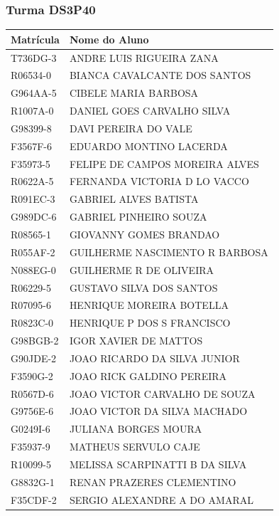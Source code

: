 \documentclass[
]{book}
\begin{document}
\subsubsection{Turma DS3P40}\label{turma-ds3p40}

\begin{longtable}[]{@{}ll@{}}
\toprule\noalign{}
Matrícula & Nome do Aluno \\
\midrule\noalign{}
\endhead
\bottomrule\noalign{}
\endlastfoot
T736DG-3 & ANDRE LUIS RIGUEIRA ZANA \\
R06534-0 & BIANCA CAVALCANTE DOS SANTOS \\
G964AA-5 & CIBELE MARIA BARBOSA \\
R1007A-0 & DANIEL GOES CARVALHO SILVA \\
G98399-8 & DAVI PEREIRA DO VALE \\
F3567F-6 & EDUARDO MONTINO LACERDA \\
F35973-5 & FELIPE DE CAMPOS MOREIRA ALVES \\
R0622A-5 & FERNANDA VICTORIA D LO VACCO \\
R091EC-3 & GABRIEL ALVES BATISTA \\
G989DC-6 & GABRIEL PINHEIRO SOUZA \\
R08565-1 & GIOVANNY GOMES BRANDAO \\
R055AF-2 & GUILHERME NASCIMENTO R BARBOSA \\
N088EG-0 & GUILHERME R DE OLIVEIRA \\
R06229-5 & GUSTAVO SILVA DOS SANTOS \\
R07095-6 & HENRIQUE MOREIRA BOTELLA \\
R0823C-0 & HENRIQUE P DOS S FRANCISCO \\
G98BGB-2 & IGOR XAVIER DE MATTOS \\
G90JDE-2 & JOAO RICARDO DA SILVA JUNIOR \\
F3590G-2 & JOAO RICK GALDINO PEREIRA \\
R0567D-6 & JOAO VICTOR CARVALHO DE SOUZA \\
G9756E-6 & JOAO VICTOR DA SILVA MACHADO \\
G0249I-6 & JULIANA BORGES MOURA \\
F35937-9 & MATHEUS SERVULO CAJE \\
R10099-5 & MELISSA SCARPINATTI B DA SILVA \\
G8832G-1 & RENAN PRAZERES CLEMENTINO \\
F35CDF-2 & SERGIO ALEXANDRE A DO AMARAL \\
\end{longtable}
\end{document}
